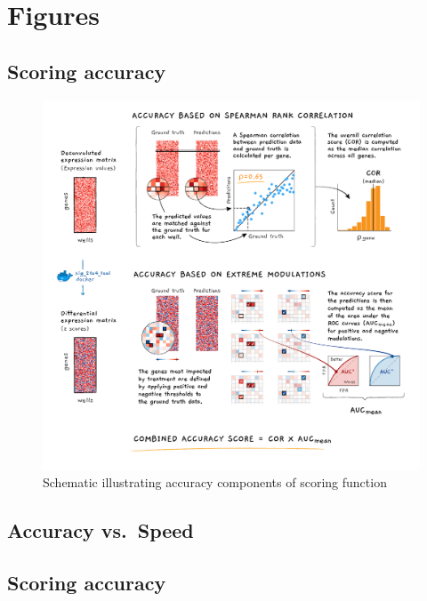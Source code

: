 \documentclass[]{article}
\begin{document}
\hypertarget{figures}{%
\section{Figures}\label{figures}}

\hypertarget{scoring-accuracy}{%
\subsection{Scoring accuracy}\label{scoring-accuracy}}

\begin{figure}
\centering
\includegraphics{figures/deconvolution_contest Fig2_Final_revised.png}
\caption{Schematic illustrating accuracy components of scoring function}
\end{figure}

\hypertarget{accuracy-vs.-speed}{%
\subsection{Accuracy vs.~Speed}\label{accuracy-vs.-speed}}

\hypertarget{scoring-accuracy-1}{%
\subsection{Scoring accuracy}\label{scoring-accuracy-1}}
\end{document}
